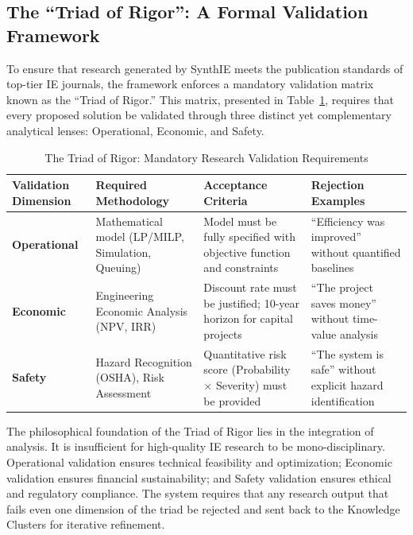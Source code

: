 \documentclass[12pt,a4paper]{article}
\begin{document}
\subsection{The ``Triad of Rigor'': A Formal Validation Framework}

To ensure that research generated by SynthIE meets the publication standards of top-tier IE journals, the framework enforces a mandatory validation matrix known as the ``Triad of Rigor.'' This matrix, presented in Table~\ref{tab:triad_rigor}, requires that every proposed solution be validated through three distinct yet complementary analytical lenses: Operational, Economic, and Safety.

\begin{table}[h]
\centering
\caption{The Triad of Rigor: Mandatory Research Validation Requirements}
\label{tab:triad_rigor}
\small
\begin{tabular}{@{}p{3.5cm}p{4cm}p{4cm}p{4cm}@{}}
\toprule
\textbf{Validation Dimension} & \textbf{Required Methodology} & \textbf{Acceptance Criteria} & \textbf{Rejection Examples} \\ \midrule
\textbf{Operational} & Mathematical model (LP/MILP, Simulation, Queuing) & Model must be fully specified with objective function and constraints & ``Efficiency was improved'' without quantified baselines \\ \addlinespace
\textbf{Economic} & Engineering Economic Analysis (NPV, IRR) & Discount rate must be justified; 10-year horizon for capital projects & ``The project saves money'' without time-value analysis \\ \addlinespace
\textbf{Safety} & Hazard Recognition (OSHA), Risk Assessment & Quantitative risk score (Probability $\times$ Severity) must be provided & ``The system is safe'' without explicit hazard identification \\ \bottomrule
\end{tabular}
\end{table}

The philosophical foundation of the Triad of Rigor lies in the integration of analysis. It is insufficient for high-quality IE research to be mono-disciplinary. Operational validation ensures technical feasibility and optimization; Economic validation ensures financial sustainability; and Safety validation ensures ethical and regulatory compliance. The system requires that any research output that fails even one dimension of the triad be rejected and sent back to the Knowledge Clusters for iterative refinement.
\end{document}
